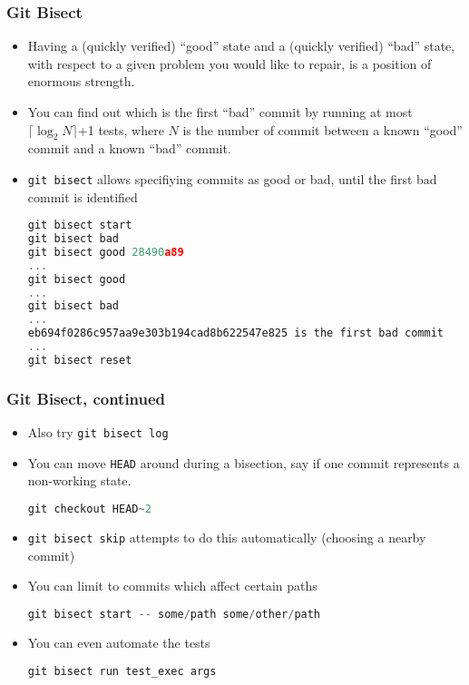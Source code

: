 \begin{frame}[fragile]
\frametitle{Git Bisect}
\begin{itemize}
\item Having a (quickly verified) ``good'' state and a (quickly verified) ``bad'' state, with respect to a given problem you would like to repair, is a position of enormous strength.
\item You can find out which is the first ``bad'' commit by running at most $\lceil \log_2{N} \rceil$+1 tests, where $N$ is the number of commit between a known ``good'' commit and a known ``bad'' commit.
\item \lstinline{git bisect} allows specifiying commits as good or bad, until the first bad commit is identified
\begin{lstlisting}[language=C++,
basicstyle=\tiny\ttfamily]
git bisect start
git bisect bad
git bisect good 28490a89
...
git bisect good
...
git bisect bad
...
eb694f0286c957aa9e303b194cad8b622547e825 is the first bad commit
...
git bisect reset
\end{lstlisting}
\end{itemize}
\end{frame}

\begin{frame}[fragile]
\frametitle{Git Bisect, continued}
\begin{itemize}
\item Also try \lstinline{git bisect log}
\item You can move \lstinline{HEAD} around during a bisection, say if one commit represents a non-working state.
\begin{lstlisting}[language=C++]
git checkout HEAD~2
\end{lstlisting}
\item \lstinline{git bisect skip} attempts to do this automatically (choosing a nearby commit)
\item You can limit to commits which affect certain paths
\begin{lstlisting}[language=C++]
git bisect start -- some/path some/other/path
\end{lstlisting}
\item You can even automate the tests
\begin{lstlisting}
git bisect run test_exec args
\end{lstlisting}
\end{itemize}
\end{frame}

